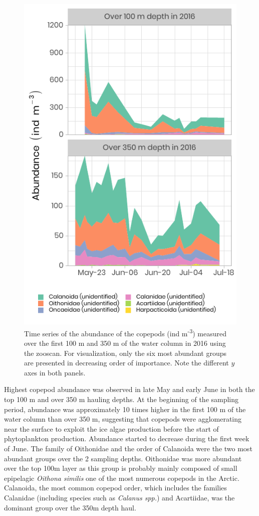 \documentclass[essd, manuscript]{copernicus}
\begin{document}
\begin{figure}[H]
	\centering
	\includegraphics[scale = 1]{../../../../graphs/fig14.pdf}
	\caption{Time series of the abundance of the copepods (ind m\textsuperscript{-3}) measured over the first 100 m and 350 m of the water column in 2016 using the zooscan. For visualization, only the six most abundant groups are presented in decreasing order of importance. Note the different $y$ axes in both panels.}
\end{figure}

Highest copepod abundance was observed in late May and early June in both the top 100 m and over 350 m hauling depths. At the beginning of the sampling period, abundance was approximately 10 times higher in the first 100 m of the water column than over 350 m, suggesting that copepods were agglomerating near the surface to exploit the ice algae production before the start of phytoplankton production. Abundance started to decrease during the first week of June. The family of Oithonidae and the order of Calanoida were the two most abundant groups over the 2 sampling depths. Oithonidae was more abundant over the top 100m layer as this group is probably mainly composed of small epipelagic \textit{Oithona similis} one of the most numerous copepods in the Arctic. Calanoida, the most common copepod order, which includes the families Calanidae (including species such as \textit{Calanus spp.}) and Acartiidae, was the dominant group over the 350m depth haul.
\end{document}
